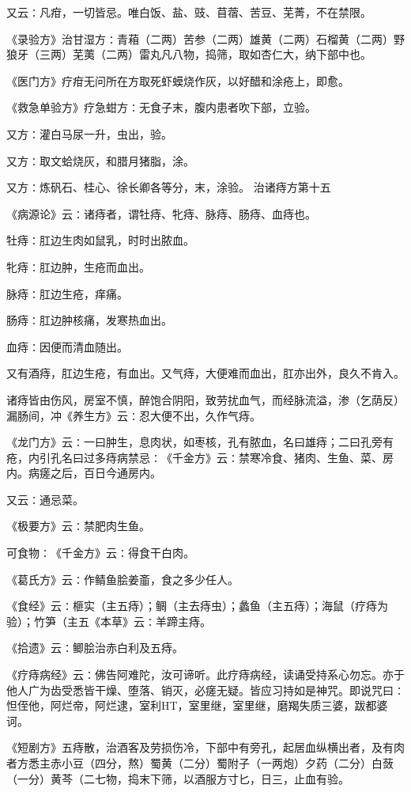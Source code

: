 \documentclass[a4paper,12pt,UTF8,twoside]{ctexbook}
\begin{document}
又云∶凡疳，一切皆忌。唯白饭、盐、豉、苜蓿、苦豆、芜菁，不在禁限。

《录验方》治甘湿方∶青葙（二两）苦参（二两）雄黄（二两）石榴黄（二两）野狼牙（三两）芜荑（二两）雷丸凡八物，捣筛，取如杏仁大，纳下部中也。

《医门方》疗疳无问所在方取死虾蟆烧作灰，以好醋和涂疮上，即愈。

《救急单验方》疗急蚶方∶无食子末，腹内患者吹下部，立验。

又方∶灌白马尿一升，虫出，验。

又方∶取文蛤烧灰，和腊月猪脂，涂。

又方∶炼矾石、桂心、徐长卿各等分，末，涂验。
治诸痔方第十五

《病源论》云∶诸痔者，谓牡痔、牝痔、脉痔、肠痔、血痔也。

牡痔∶肛边生肉如鼠乳，时时出脓血。

牝痔∶肛边肿，生疮而血出。

脉痔∶肛边生疮，痒痛。

肠痔∶肛边肿核痛，发寒热血出。

血痔∶因便而清血随出。

又有酒痔，肛边生疮，有血出。又气痔，大便难而血出，肛亦出外，良久不肯入。

诸痔皆由伤风，房室不慎，醉饱合阴阳，致劳扰血气，而经脉流溢，渗（乞荫反）漏肠间，冲《养生方》云∶忍大便不出，久作气痔。

《龙门方》云∶一曰肿生，息肉状，如枣核，孔有脓血，名曰雄痔；二曰孔旁有疮，内引孔名曰过多痔病禁忌∶《千金方》云∶禁寒冷食、猪肉、生鱼、菜、房内。病瘥之后，百日今通房内。

又云∶通忌菜。

《极要方》云∶禁肥肉生鱼。

可食物∶《千金方》云∶得食干白肉。

《葛氏方》云∶作鲭鱼脍姜齑，食之多少任人。

《食经》云∶榧实（主五痔）；鲷（主去痔虫）；蠡鱼（主五痔）；海鼠（疗痔为验）；竹笋（主五《本草》云∶羊蹄主痔。

《拾遗》云∶鲫脍治赤白利及五痔。

《疗痔病经》云∶佛告阿难陀，汝可谛听。此疗痔病经，读诵受持系心勿忘。亦于他人广为齿受悉皆干燥、堕落、销灭，必瘥无疑。皆应习持如是神咒。即说咒曰∶怛侄他，阿烂帝，阿烂逮，室利HT，室里继，室里继，磨羯失质三婆，跋都婆诃。

《短剧方》五痔散，治酒客及劳损伤冷，下部中有旁孔，起居血纵横出者，及有肉者方悉主赤小豆（四分，熬）蜀黄（二分）蜀附子（一两炮）夕药（二分）白蔹（一分）黄芩（二七物，捣末下筛，以酒服方寸匕，日三，止血有验。
\end{document}
